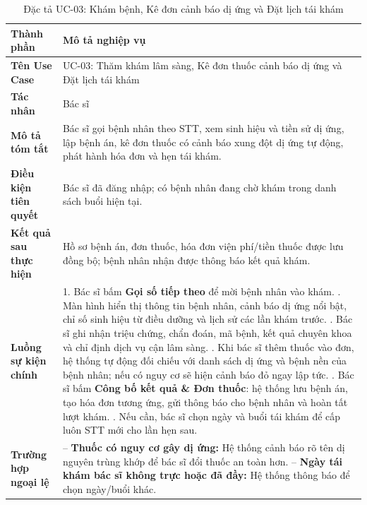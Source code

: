 \documentclass[12pt,a4paper]{report}
\begin{document}
\begin{table}[H]
  \centering
  \caption{Đặc tả UC-03: Khám bệnh, Kê đơn cảnh báo dị ứng và Đặt lịch tái khám}
  \begin{tabularx}{\textwidth}{@{}l X@{}}
    \toprule
    \textbf{Thành phần} & \textbf{Mô tả nghiệp vụ} \\
    \midrule
    \textbf{Tên Use Case} & UC-03: Thăm khám lâm sàng, Kê đơn thuốc cảnh báo dị ứng và Đặt lịch tái khám \\
    \textbf{Tác nhân} & Bác sĩ \\
    \textbf{Mô tả tóm tắt} & Bác sĩ gọi bệnh nhân theo STT, xem sinh hiệu và tiền sử dị ứng, lập bệnh án, kê đơn thuốc có cảnh báo xung đột dị ứng tự động, phát hành hóa đơn và hẹn tái khám. \\
    \textbf{Điều kiện tiên quyết} & Bác sĩ đã đăng nhập; có bệnh nhân đang chờ khám trong danh sách buổi hiện tại. \\
    \textbf{Kết quả sau thực hiện} & Hồ sơ bệnh án, đơn thuốc, hóa đơn viện phí/tiền thuốc được lưu đồng bộ; bệnh nhân nhận được thông báo kết quả khám. \\
    \textbf{Luồng sự kiện chính} &
      1. Bác sĩ bấm \textbf{Gọi số tiếp theo} để mời bệnh nhân vào khám. \newline
      2. Màn hình hiển thị thông tin bệnh nhân, cảnh báo dị ứng nổi bật, chỉ số sinh hiệu từ điều dưỡng và lịch sử các lần khám trước. \newline
      3. Bác sĩ ghi nhận triệu chứng, chẩn đoán, mã bệnh, kết quả chuyên khoa và chỉ định dịch vụ cận lâm sàng. \newline
      4. Khi bác sĩ thêm thuốc vào đơn, hệ thống tự động đối chiếu với danh sách dị ứng và bệnh nền của bệnh nhân; nếu có nguy cơ sẽ hiện cảnh báo đỏ ngay lập tức. \newline
      5. Bác sĩ bấm \textbf{Công bố kết quả \& Đơn thuốc}: hệ thống lưu bệnh án, tạo hóa đơn tương ứng, gửi thông báo cho bệnh nhân và hoàn tất lượt khám. \newline
      6. Nếu cần, bác sĩ chọn ngày và buổi tái khám để cấp luôn STT mới cho lần hẹn sau. \\
    \textbf{Trường hợp ngoại lệ} &
      -- \textbf{Thuốc có nguy cơ gây dị ứng:} Hệ thống cảnh báo rõ tên dị nguyên trùng khớp để bác sĩ đổi thuốc an toàn hơn. \newline
      -- \textbf{Ngày tái khám bác sĩ không trực hoặc đã đầy:} Hệ thống thông báo để chọn ngày/buổi khác. \\
    \bottomrule
  \end{tabularx}
\end{table}
\end{document}
